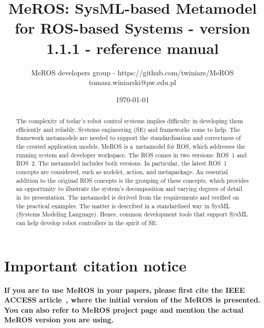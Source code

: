 \documentclass[11pt,oneside,a4paper]{article}
\begin{document}
	
	\title{MeROS: SysML-based Metamodel for ROS-based Systems - version 1.1.1 - reference manual}
\author{MeROS developers group - https://github.com/twiniars/MeROS \\ tomasz.winiarski@pw.edu.pl}
\date{\today}
\maketitle


	\begin{abstract}
		The complexity of today's robot control systems implies difficulty in developing them efficiently and reliably. Systems engineering (SE) and frameworks come to help. The framework metamodels are needed to support the standardisation and correctness of the created application models. MeROS is a~metamodel for ROS, which addresses the running system and developer workspace. The ROS comes in two versions: ROS~1 and ROS~2. The metamodel includes both versions. In particular, the latest ROS~1 concepts are considered, such as nodelet, action, and metapackage. An essential addition to the original ROS concepts is the grouping of these concepts, which provides an opportunity to illustrate the system's decomposition and varying degrees of detail in its presentation. The metamodel is derived from the requirements and verified on the practical examples. The matter is described in a standardised way in SysML (Systems Modeling Language). Hence, common development tools that support SysML can help develop robot controllers in the spirit of SE.
	\end{abstract}
	
	
	
	\maketitle
	
	\section*{Important citation notice}

\textbf{If you are to use MeROS in your papers, please first cite the IEEE ACCESS  article~\cite{meros-access}, where the initial version of the MeROS is presented. You can also refer to MeROS project page \cite{meros-www} and mention the actual MeROS version you are using.}
	
	
\end{document}

